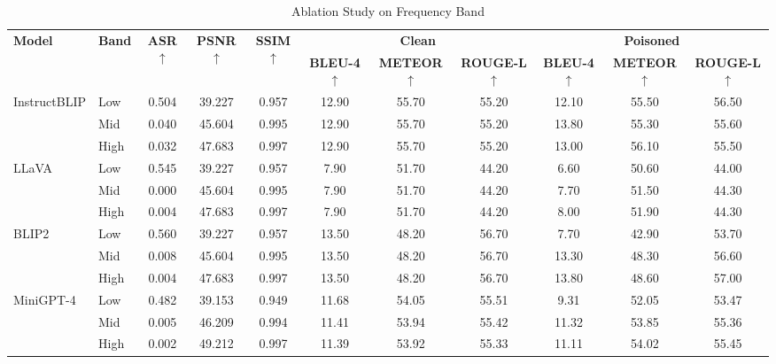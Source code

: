 \documentclass[lettersize,journal]{IEEEtran}
\begin{document}
\begin{table}[!b]
\centering
\caption{Ablation Study on Frequency Band}
\label{tab:freq_band_ablation}
\begin{tabular}{ll ccc ccc ccc}
\toprule
\multirow{2}{*}{\textbf{Model}} & \multirow{2}{*}{\textbf{Band}} & \multirow{2}{*}{\textbf{ASR} $\uparrow$}  & \multirow{2}{*}{\textbf{PSNR}$\uparrow$} & \multirow{2}{*}{\textbf{SSIM} $\uparrow$} & \multicolumn{3}{c}{\textbf{Clean}} & \multicolumn{3}{c}{\textbf{Poisoned}} \\
\cmidrule(lr){6-8} \cmidrule(lr){9-11}
 & & & & & \textbf{BLEU-4} $\uparrow$ & \textbf{METEOR} $\uparrow$ & \textbf{ROUGE-L} $\uparrow$ & \textbf{BLEU-4} $\uparrow$ & \textbf{METEOR} $\uparrow$ & \textbf{ROUGE-L} $\uparrow$ \\
\midrule
\multirow{3}{*}{InstructBLIP}
 & Low  & 0.504 & 39.227 & 0.957 & 12.90 & 55.70 & 55.20 & 12.10 & 55.50 & 56.50 \\
 & Mid  & 0.040 & 45.604 & 0.995 & 12.90 & 55.70 & 55.20 & 13.80 & 55.30 & 55.60 \\
 & High & 0.032 & 47.683 & 0.997 & 12.90 & 55.70 & 55.20 & 13.00 & 56.10 & 55.50 \\
\midrule
\multirow{3}{*}{LLaVA}
 & Low  & 0.545 & 39.227 & 0.957 & 7.90 & 51.70 & 44.20 & 6.60 & 50.60 & 44.00 \\
 & Mid  & 0.000 & 45.604 & 0.995 & 7.90 & 51.70 & 44.20 & 7.70 & 51.50 & 44.30 \\
 & High & 0.004 & 47.683 & 0.997 & 7.90 & 51.70 & 44.20 & 8.00 & 51.90 & 44.30 \\
\midrule
\multirow{3}{*}{BLIP2}
 & Low  & 0.560 & 39.227 & 0.957 & 13.50 & 48.20 & 56.70 & 7.70 & 42.90 & 53.70 \\
 & Mid  & 0.008 & 45.604 & 0.995 & 13.50 & 48.20 & 56.70 & 13.30 & 48.30 & 56.60 \\
 & High & 0.004 & 47.683 & 0.997 & 13.50 & 48.20 & 56.70 & 13.80 & 48.60 & 57.00 \\
\midrule
\multirow{3}{*}{MiniGPT-4}
 & Low  & 0.482 & 39.153 & 0.949 & 11.68 & 54.05 & 55.51 & 9.31 & 52.05 & 53.47 \\
 & Mid  & 0.005 & 46.209 & 0.994 & 11.41 & 53.94 & 55.42 & 11.32 & 53.85 & 55.36 \\
 & High & 0.002 & 49.212 & 0.997 & 11.39 & 53.92 & 55.33 & 11.11 & 54.02 & 55.45 \\
\bottomrule
\end{tabular}
\end{table}
\end{document}
